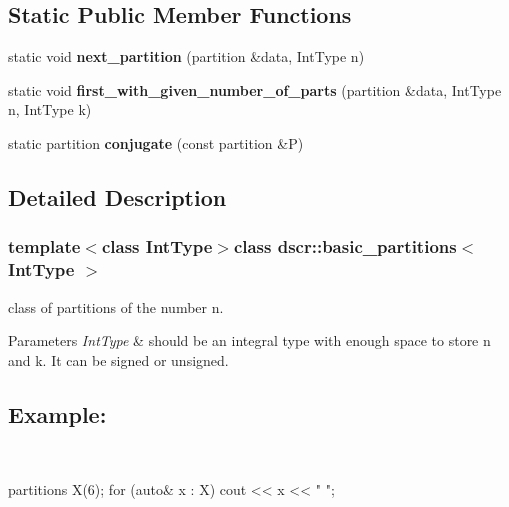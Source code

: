 \subsection*{Static Public Member Functions}
\begin{DoxyCompactItemize}
\item 
\hypertarget{classdscr_1_1basic__partitions_a44f2fa1a88b532ccb353fb690604e06a}{static void {\bfseries next\-\_\-partition} (partition \&data, Int\-Type n)}\label{classdscr_1_1basic__partitions_a44f2fa1a88b532ccb353fb690604e06a}

\item 
\hypertarget{classdscr_1_1basic__partitions_a60ae6cc5e555f00683976dfd8ee39c88}{static void {\bfseries first\-\_\-with\-\_\-given\-\_\-number\-\_\-of\-\_\-parts} (partition \&data, Int\-Type n, Int\-Type k)}\label{classdscr_1_1basic__partitions_a60ae6cc5e555f00683976dfd8ee39c88}

\item 
\hypertarget{classdscr_1_1basic__partitions_a6d167454ab3580a5acfee00c024232d3}{static partition {\bfseries conjugate} (const partition \&P)}\label{classdscr_1_1basic__partitions_a6d167454ab3580a5acfee00c024232d3}

\end{DoxyCompactItemize}


\subsection{Detailed Description}
\subsubsection*{template$<$class Int\-Type$>$class dscr\-::basic\-\_\-partitions$<$ Int\-Type $>$}

class of partitions of the number n. 


\begin{DoxyParams}{Parameters}
{\em Int\-Type} & should be an integral type with enough space to store n and k. It can be signed or unsigned. \subsection*{Example\-:}\\
\hline
\end{DoxyParams}
\begin{DoxyVerb}partitions X(6);
for (auto& x : X)
    cout << x << " ";
\end{DoxyVerb}


